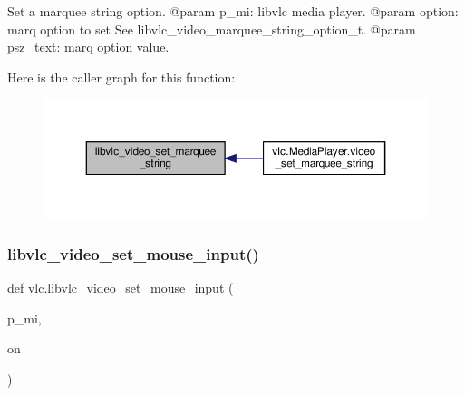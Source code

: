 \begin{DoxyVerb}Set a marquee string option.
@param p_mi: libvlc media player.
@param option: marq option to set See libvlc_video_marquee_string_option_t.
@param psz_text: marq option value.
\end{DoxyVerb}
 Here is the caller graph for this function\+:
\nopagebreak
\begin{figure}[H]
\begin{center}
\leavevmode
\includegraphics[width=350pt]{namespacevlc_a820aaf1f58ece503b1e97ca798c8f117_icgraph}
\end{center}
\end{figure}
\mbox{\label{namespacevlc_a441b6e87f5bb7c378d9c47250ab21607}} 
\subsubsection{\texorpdfstring{libvlc\+\_\+video\+\_\+set\+\_\+mouse\+\_\+input()}{libvlc\_video\_set\_mouse\_input()}}
{\footnotesize\ttfamily def vlc.\+libvlc\+\_\+video\+\_\+set\+\_\+mouse\+\_\+input (\begin{DoxyParamCaption}\item[{}]{p\+\_\+mi,  }\item[{}]{on }\end{DoxyParamCaption})}

